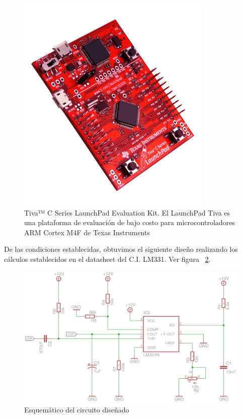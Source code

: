 \begin{figure}[h!]
  \centering
  \includegraphics[scale=1.5]{images/activities/motor_pololu/tiva.jpg}
  \caption{Tiva™ C Series LaunchPad Evaluation Kit. El LaunchPad Tiva es una plataforma de evaluación de bajo costo para microcontroladores ARM Cortex M4F de Texas Instruments}
  \label{fig:tiva}
\end{figure}

De las condiciones establecidas, obtuvimos el siguiente diseño realizando los cálculos establecidos en el datasheet del C.I. LM331. Ver figura ~\ref{fig:schematic-motor-pololu}.

\begin{figure}[h!]
  \centering
  \includegraphics[scale=0.3]{images/activities/motor_pololu/schematic-motor-pololu.png}
  \caption{Esquemático del circuito diseñado}
  \label{fig:schematic-motor-pololu}
\end{figure}

